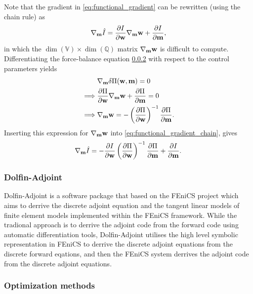 Note that the gradient in
\eqref{eq:functional_gradient} can be rewritten (using the chain rule)
as
\begin{align}
  \nabla_{\mathbf{m}} \hat{I} =  \frac{\partial  I }{\partial \mathbf{w}} \nabla_{\mathbf{m}} \mathbf{w}
  + \frac{\partial  I }{\partial \mathbf{m}},
  \label{eq:functional_gradient_chain}
\end{align}
in which the $\dim(\mathbb{V}) \times \dim(\mathbb{Q})$ matrix
$\nabla_{\mathbf{m}} \mathbf{w}$ is difficult to compute.
Differentiating the force-balance equation \ref{} with respect to the
control parameters yields
\begin{align}
  & \nabla_{\mathbf{m}} \delta \Pi(\mathbf{w}, \mathbf{m}) = 0 \\
  \implies & \frac{\partial  \Pi }{\partial \mathbf{w}} \nabla_{\mathbf{m}} \mathbf{w}
  + \frac{\partial  \Pi }{\partial \mathbf{m}} = 0 \\
  \implies & \nabla_{\mathbf{m}} \mathbf{w} =
             - \left( \frac{\partial  \Pi }{\partial \mathbf{w}} \right)^{-1} \frac{\partial  \Pi }{\partial \mathbf{m}}.
\end{align}
Inserting this expression for $\nabla_{\mathbf{m}} \mathbf{w}$ into
\eqref{eq:functional_gradient_chain}, gives
\begin{align}
  \nabla_{\mathbf{m}} \hat{I} =  - \frac{\partial  I }{\partial \mathbf{w}}
  \left( \frac{\partial  \Pi }{\partial \mathbf{w}} \right)^{-1} \frac{\partial  \Pi }{\partial \mathbf{m}}
  + \frac{\partial  I }{\partial \mathbf{m}}.
\end{align}


\subsubsection{Dolfin-Adjoint}

Dolfin-Adjoint is a software package that based on the FEniCS project
which aims to derrive the discrete adjoint equation and the tangent
linear models of finite element models implemented within the FEniCS
framework. While the tradional approach is to derrive the adjoint code
from the forward code using automatic differentiation tools,
Dolfin-Adjoint utilises the high level symbolic representation
\cite{UFL} in FEniCS to derrive the discrete adjoint equations from
the discrete forward eqations, and then the FEniCS system derrives the
adjoint code from the discrete adjoint equations. 

\subsubsection{Optimization methods}


